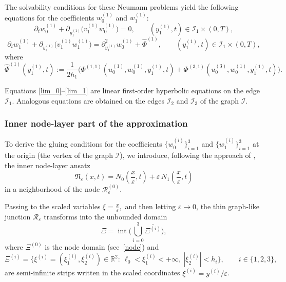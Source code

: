 \documentclass[reqno]{amsart}            %
\numberwithin{equation}{section}
\begin{document}
	The solvability conditions for these Neumann problems yield the following
	equations for the coefficients $w^{(1)}_0$ and $w^{(1)}_1$:
	\begin{equation}\label{lim_0}
		\partial_t w^{(1)}_0
		+ \partial_{y^{(1)}_1}\!\big(v_1^{(1)} w^{(1)}_0\big)
		= 0,
		\qquad (y^{(1)}_1,t)\in\mathcal{I}_1\times(0,T),
	\end{equation}
	\begin{equation}\label{lim_1}
		\partial_t w^{(1)}_1
		+ \partial_{y^{(1)}_1}\!\big(v_1^{(1)} w^{(1)}_1\big)
		= \partial_{y^{(1)}_1}^2 w^{(1)}_0 + \widehat{\Phi}^{(1)},
		\qquad (y^{(1)}_1,t)\in\mathcal{I}_1\times(0,T),
	\end{equation}
	where
	\begin{equation}\label{fun_1}
		\widehat{\Phi}^{(1)}(y^{(1)}_1,t)
		:= \frac{1}{2h_1}\Big(
		\Phi^{(1,1)}(u^{(1)}_0,w^{(1)}_0,y^{(1)}_1,t)
		+ \Phi^{(3,1)}(u^{(3)}_0,w^{(1)}_0,y^{(1)}_1,t)
		\Big).
	\end{equation}
	
	Equations \eqref{lim_0}–\eqref{lim_1} are linear first‑order hyperbolic equations on the edge $\mathcal{I}_1$.  
	Analogous equations are obtained on the edges $\mathcal{I}_2$ and $\mathcal{I}_3$ of the graph $\mathcal{I}$.
	
	
	\subsubsection{Inner node-layer part of the approximation}\label{subsec_Inner_part}
	
	To derive the gluing conditions for the coefficients
	$\{w_0^{(i)}\}_{i=1}^3$ and $\{w_1^{(i)}\}_{i=1}^3$ at the origin (the vertex of the graph $\mathcal{I}$),
	we introduce, following the approach of
	\cite{Mel-Roh_AA-2024,Mel-Roh_JMAA-2024}, the inner node-layer ansatz
	\begin{equation}\label{junc}
		\mathfrak{N}_\varepsilon(x,t)
		= N_0\!\left(\frac{x}{\varepsilon},t\right)
		+ \varepsilon\,N_1\!\left(\frac{x}{\varepsilon},t\right)
	\end{equation}
	in a neighborhood of the node $\mathcal{R}^{(0)}_\varepsilon$.
	
	Passing to the scaled variables
	$
	\xi=\frac{x}{\varepsilon},
	$
	and then letting $\varepsilon\to0$, the thin graph-like junction
	$\mathcal{R}_\varepsilon$ transforms into the unbounded domain
	\[
	\Xi=\operatorname{int}\Big(\bigcup_{i=0}^3\overline{\Xi^{(i)}}\Big),
	\]
	where $\Xi^{(0)}$ is the node domain (see~\eqref{node}) and
	\[
	\Xi^{(i)}
	=\big\{\xi^{(i)}=(\xi^{(i)}_1,\xi^{(i)}_2)\in\mathbb{R}^2:\ 
	\ell_0<\xi^{(i)}_1<+\infty,\ |\xi^{(i)}_2|<h_i\big\},
	\qquad i\in\{1,2,3\},
	\]
	are semi-infinite strips written in the scaled coordinates
	$\xi^{(i)}=y^{(i)}/\varepsilon$.
	
\end{document}

